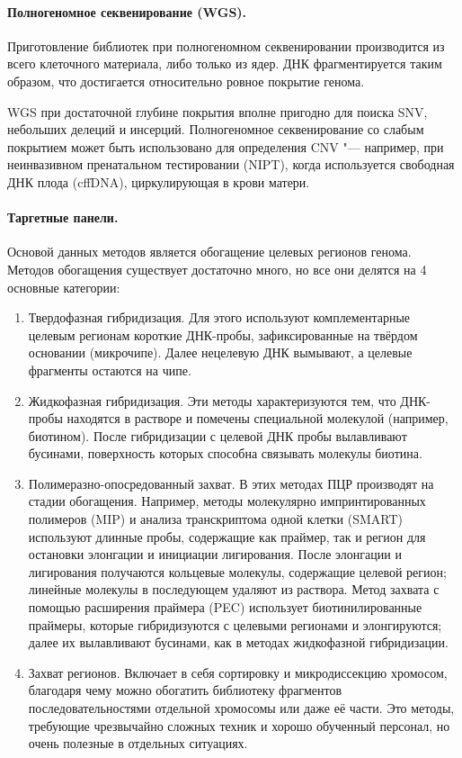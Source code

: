 \documentclass[a4paper,12pt]{article}
\begin{document}
\paragraph{Полногеномное секвенирование (WGS).}
Приготовление библиотек при полногеномном секвенировании производится из всего клеточного материала, либо только из ядер.
ДНК фрагментируется таким образом, что достигается относительно ровное покрытие генома.

WGS при достаточной глубине покрытия вполне пригодно для поиска SNV, небольших делеций и инсерций.
Полногеномное секвенирование со слабым покрытием может быть использовано для определения CNV "--- например, при неинвазивном пренатальном тестировании (NIPT), когда используется свободная ДНК плода (cffDNA), циркулирующая в крови матери\cite{yu}.

\paragraph{Таргетные панели.}
Основой данных методов является обогащение целевых регионов генома.
Методов обогащения существует достаточно много, но все они делятся на 4 основные категории\cite{teer}:

\begin{enumerate}
\item Твердофазная гибридизация.
Для этого используют комплементарные целевым регионам короткие ДНК-пробы, зафиксированные на твёрдом основании (микрочипе).
Далее нецелевую ДНК вымывают, а целевые фрагменты остаются на чипе.
\item Жидкофазная гибридизация.
Эти методы характеризуются тем, что ДНК-пробы находятся в растворе и помечены специальной молекулой (например, биотином).
После гибридизации с целевой ДНК пробы вылавливают бусинами, поверхность которых способна связывать молекулы биотина.
\item Полимеразно-опосредованный захват.
В этих методах ПЦР производят на стадии обогащения.
Например, методы молекулярно импринтированных полимеров (MIP) и анализа транскриптома одной клетки (SMART) используют длинные пробы, содержащие как праймер, так и регион для остановки элонгации и инициации лигирования.
После элонгации и лигирования получаются кольцевые молекулы, содержащие целевой регион;
линейные молекулы в последующем удаляют из раствора.
Метод захвата с помощью расширения праймера (PEC) использует биотинилированные праймеры, которые гибридизуются с целевыми регионами и элонгируются;
далее их вылавливают бусинами, как в методах жидкофазной гибридизации.
\item Захват регионов.
Включает в себя сортировку и микродиссекцию хромосом, благодаря чему можно обогатить библиотеку фрагментов последовательностями отдельной хромосомы или даже её части.
Это методы, требующие чрезвычайно сложных техник и хорошо обученный персонал, но очень полезные в отдельных ситуациях.
\end{enumerate}
\end{document}
